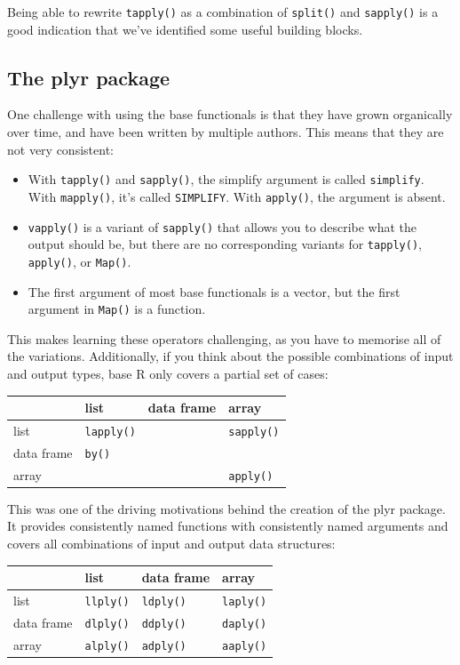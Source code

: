 Being able to rewrite \texttt{tapply()} as a combination of
\texttt{split()} and \texttt{sapply()} is a good indication that we've
identified some useful building blocks. 

\subsection{The plyr package}

One challenge with using the base functionals is that they have grown
organically over time, and have been written by multiple authors. This
means that they are not very consistent: 

\begin{itemize}
\item
  With \texttt{tapply()} and \texttt{sapply()}, the simplify argument is
  called \texttt{simplify}. With \texttt{mapply()}, it's called
  \texttt{SIMPLIFY}. With \texttt{apply()}, the argument is absent.
\item
  \texttt{vapply()} is a variant of \texttt{sapply()} that allows you to
  describe what the output should be, but there are no corresponding
  variants for \texttt{tapply()}, \texttt{apply()}, or \texttt{Map()}.
\item
  The first argument of most base functionals is a vector, but the first
  argument in \texttt{Map()} is a function.
\end{itemize}

This makes learning these operators challenging, as you have to memorise
all of the variations. Additionally, if you think about the possible
combinations of input and output types, base R only covers a partial set
of cases:

\begin{longtable}[c]{@{}llll@{}}
\toprule
& list & data frame & array\tabularnewline
\midrule
\endhead
list & \texttt{lapply()} & & \texttt{sapply()}\tabularnewline
data frame & \texttt{by()} & &\tabularnewline
array & & & \texttt{apply()}\tabularnewline
\bottomrule
\end{longtable}

This was one of the driving motivations behind the creation of the plyr
package. It provides consistently named functions with consistently
named arguments and covers all combinations of input and output data
structures:

\begin{longtable}[c]{@{}llll@{}}
\toprule
& list & data frame & array\tabularnewline
\midrule
\endhead
list & \texttt{llply()} & \texttt{ldply()} &
\texttt{laply()}\tabularnewline
data frame & \texttt{dlply()} & \texttt{ddply()} &
\texttt{daply()}\tabularnewline
array & \texttt{alply()} & \texttt{adply()} &
\texttt{aaply()}\tabularnewline
\bottomrule
\end{longtable}

